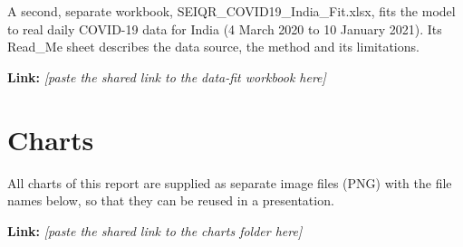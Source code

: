 \documentclass[12pt,a4paper]{article}
\theoremstyle{definition}
\begin{document}
A second, separate workbook, SEIQR\_COVID19\_India\_Fit.xlsx, fits the model to real daily COVID-19 data for India (4 March 2020 to 10 January 2021). Its Read\_Me sheet describes the data source, the method and its limitations.


\textbf{Link: }\textit{[paste the shared link to the data-fit workbook here]}


\section{Charts}

All charts of this report are supplied as separate image files (PNG) with the file names below, so that they can be reused in a presentation.


\textbf{Link: }\textit{[paste the shared link to the charts folder here]}
\end{document}
